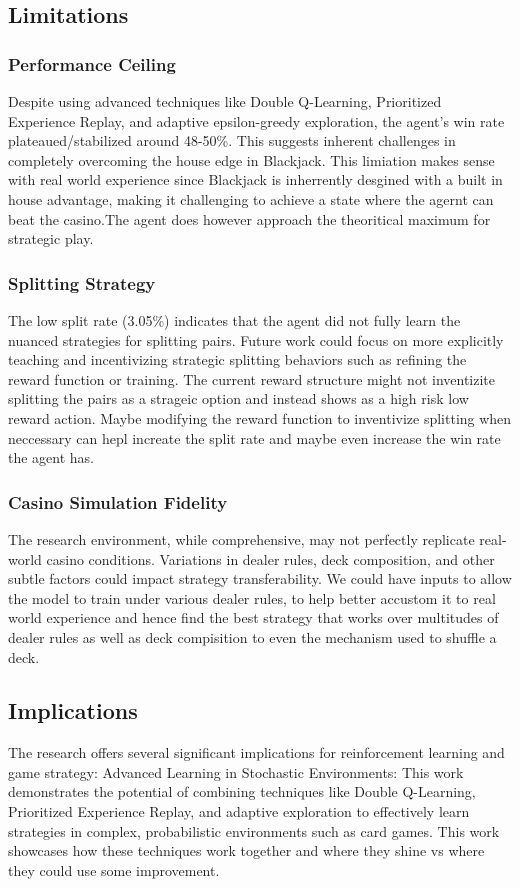 \documentclass[10pt]{article}
\theoremstyle{definition}
\begin{document}
\subsection{Limitations}
\subsubsection{Performance Ceiling}
Despite using advanced techniques like Double Q-Learning, Prioritized Experience Replay, and adaptive epsilon-greedy exploration, 
the agent's win rate plateaued/stabilized around 48-50\%. 
This suggests inherent challenges in completely overcoming the house edge in Blackjack. 
This limiation makes sense with real world experience since Blackjack is inherrently desgined with a built in house advantage, 
making it challenging to achieve a state where the agernt can beat the casino.The agent does however approach the theoritical maximum for strategic play.
\subsubsection{Splitting Strategy}
The low split rate (3.05\%) indicates that the agent did not fully learn the nuanced strategies for splitting pairs. 
Future work could focus on more explicitly teaching and incentivizing strategic splitting behaviors such as refining 
the reward function or training. The current reward structure might not inventizite splitting the pairs as a strageic 
option and instead shows as a high risk low reward action. Maybe modifying the reward function to inventivize splitting 
when neccessary can hepl increate the split rate and maybe even increase the win rate the agent has.
\subsubsection{Casino Simulation Fidelity}
The research environment, while comprehensive, may not perfectly replicate real-world casino conditions. 
Variations in dealer rules, deck composition, and other subtle factors could impact strategy transferability. 
We could have inputs to allow the model to train under various dealer rules, to help better accustom it to real world 
experience and hence find the best strategy that works over multitudes of dealer rules as well as deck compisition to 
even the mechanism used to shuffle a deck.
\subsection{Implications}
The research offers several significant implications for reinforcement learning and game strategy:
Advanced Learning in Stochastic Environments: This work demonstrates the potential of combining techniques like Double Q-Learning, 
Prioritized Experience Replay, and adaptive exploration to effectively learn strategies in complex, probabilistic environments such as card games. 
This work showcases how these techniques work together and where they shine vs where they could use some improvement.
\end{document}
